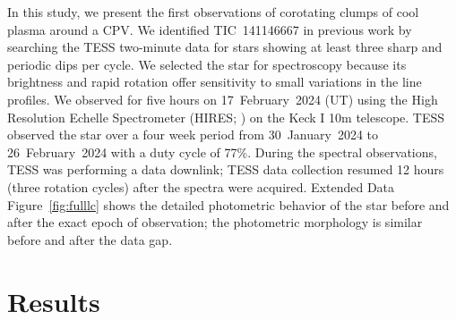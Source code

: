 \documentclass{nature3}
\begin{document}
In this study, we present the first observations of corotating clumps of
cool plasma around a CPV.  We identified TIC~141146667 in previous work
\cite{Bouma2024} by searching the TESS two-minute data \cite{Ricker2015}
for stars showing at least three sharp and periodic dips per cycle.  We
selected the star for spectroscopy because its brightness and rapid
rotation offer sensitivity to small variations in the line profiles.  We
observed for five hours on 17~February~2024 (UT) using the High
Resolution Echelle Spectrometer (HIRES; \cite{vogt_hires_1994}) on the
Keck I 10m telescope.  TESS observed the star over a four week period
from 30~January~2024 to 26~February~2024 with a duty cycle of 77\%.
During the spectral observations, TESS was performing a data downlink;
TESS data collection resumed 12 hours (three rotation cycles) after the
spectra were acquired.  Extended Data Figure~\ref{fig:fulllc} shows the
detailed photometric behavior of the star before and after the exact
epoch of observation; the photometric morphology is similar before and
after the data gap.


\section{Results}
\end{document}

